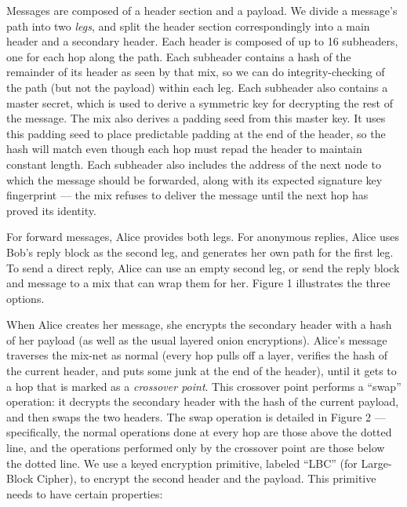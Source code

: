 \documentclass[final,inpress,inline]{ieee}
\begin{document}
Messages are composed of a header section and a payload. We divide
a message's path into two \emph{legs}, and split the header section
correspondingly into a main header and a secondary header. Each header
is composed of up to 16 subheaders, one for each hop along the path.
Each subheader contains a hash of the remainder of its header as
seen by that mix, so we can do
integrity-checking of the path (but not the payload) within each leg.
Each subheader also contains a master secret, which is used to derive a
symmetric key for decrypting the rest of the message. The mix also
derives a padding seed from this master key. It uses this padding seed
to place predictable padding at the end of the header, so the hash will
match even though each hop must repad the header to maintain constant
length. Each subheader also includes the address of the next node to which
the message should be forwarded, along with its expected signature key
fingerprint --- the mix refuses to deliver the message until the next
hop has proved its identity.

For forward messages, Alice provides both legs. For anonymous replies, Alice
uses Bob's reply block as the second leg, and generates her own path
for the first leg.  To send a direct reply, Alice can use an empty
second leg, or send the reply block and message to a mix that can wrap
them for her. Figure 1 illustrates the three options.

When Alice creates her message, she encrypts the secondary header with a hash
of her payload (as well as the usual layered onion encryptions). Alice's
message traverses the mix-net as normal (every hop pulls off a layer,
verifies the hash of the current header, and puts some junk at the end of the
header), until it gets to a hop that is marked as a \emph{crossover
  point}. This crossover point performs a ``swap'' operation: it decrypts the
secondary header with the hash of the current payload, and then swaps the two
headers. The swap operation is detailed in Figure 2 --- specifically, the
normal operations done at every hop are those above the dotted line, and the
operations performed only by the crossover point are those below the dotted
line.  We use a keyed encryption primitive, labeled ``LBC'' (for Large-Block
Cipher), to encrypt the second header and the payload.  This primitive needs
to have certain properties:
\end{document}
